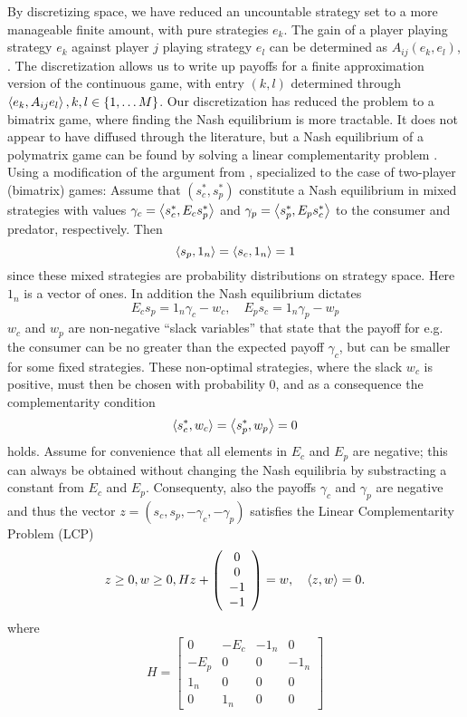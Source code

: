 By discretizing space, we have reduced an uncountable strategy set to a more manageable finite amount, with pure strategies $e_k$. The gain of a player playing strategy $e_k$ against player $j$ playing strategy $e_l$ can be determined as $A_{ij}(e_k,e_l)$, . The discretization allows us to write up payoffs for a finite approximation version of the continuous game,  with entry $(k,l)$ determined through $\left \langle e_k,A_{ij}e_l \right \rangle, k,l \in \{1,\dots M\}$.
Our discretization has reduced the problem to a bimatrix game, where finding the Nash equilibrium is more tractable.
It does not appear to have diffused through the literature, but a Nash equilibrium of a polymatrix game can be found by solving a linear complementarity problem \citep{miller1991copositive}. Using a modification of the argument from \citep{miller1991copositive}, specialized to the case of two-player (bimatrix) games: Assume that $(s^*_c,s^*_p)$ constitute a Nash equilibrium in mixed strategies with values $\gamma_c = \left \langle s^*_c,E_c s^*_p \right \rangle$ and   $\gamma_p = \left \langle s^*_p,E_p s^*_c \right \rangle$ to the consumer and predator, respectively. Then
\[
  \left \langle s_p,1_n \right \rangle =
  \left \langle s_c,1_n \right \rangle =
  1
\]
since these mixed strategies are probability distributions on strategy space. Here $1_n$ is a vector of ones. In addition the Nash equilibrium dictates
\[
  E_c s_p = 1_n \gamma_c - w_c
  ,\quad
  E_p s_c = 1_n \gamma_p  - w_p
\]
$w_c$ and $w_p$ are non-negative ``slack variables'' that state that the payoff for e.g. the consumer can be no greater than the expected payoff $\gamma_c$, but can be smaller for some fixed strategies. These non-optimal strategies, where the slack $w_c$ is positive, must then be chosen with probability 0, and as a consequence the complementarity condition
\[
  \left \langle s^*_c,w_c \right \rangle =   \left \langle s^*_p,w_p \right \rangle = 0
\]
holds. Assume for convenience that all elements in $E_c$ and $E_p$ are negative; this can always be obtained without changing the Nash equilibria by substracting a constant from $E_c$ and $E_p$. Consequenty, also the payoffs $\gamma_c$ and $\gamma_p$ are negative and thus the vector $z = (s_c,s_p,-\gamma_c,-\gamma_p)$ satisfies the Linear Complementarity Problem (LCP)
\[
\label{eq:lcp}
  z \geq 0,
  w \geq 0 ,
  H
  z
  +
  \left(
    \begin{array}{c}
      0 \\
      0 \\
      -1 \\
      -1
    \end{array}
  \right)
  =
  w
  ,
  \quad
  \left \langle z,w \right \rangle = 0
  .
\]
where
\[
  H =
  \left[
    \begin{array}{cccc}
      0 & -E_c & -1_n & 0 \\ -E_p & 0 & 0 & -1_n \\
      1_n & 0 & 0 & 0 \\
      0 & 1_n & 0 & 0
    \end{array}
  \right]
\]
